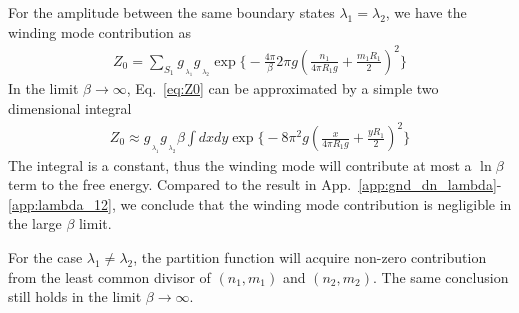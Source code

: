 For the amplitude between the same boundary states $\lambda_1=\lambda_2$, we have the winding mode contribution as
\begin{equation}
\begin{aligned}
\label{eq:Z0}
Z_0 = \sum_{S_1 } g_{\,\!_{\lambda_1} }g_{\,\!_{\lambda_2} } \exp\Big\{- \frac{4\pi}{\beta} 2 \pi g ( \frac{n_1}{ 4 \pi R_1 g} + \frac{m_1 R_1 }{ 2} )^2 \Big\}
\end{aligned}
\end{equation}
In the limit $\beta\rightarrow\infty$, Eq.~\eqref{eq:Z0} can be approximated by a simple two dimensional integral
\begin{equation}\begin{aligned}
Z_0\approx g_{\,\!_{\lambda_1} }g_{\,\!_{\lambda_2} }\beta\int dxdy\exp\Big\{-8 \pi^2 g ( \frac{x}{ 4 \pi R_1 g} + \frac{y R_1 }{ 2} )^2 \Big\}
\end{aligned}\end{equation}
The integral is a constant, thus the winding mode will contribute at most a $\ln\beta$ term to the free energy. Compared to the result in App.~\ref{app:gnd_dn_lambda}-\ref{app:lambda_12}, we conclude that the winding mode contribution is negligible in the large $\beta$ limit. 

For the case $\lambda_1\neq\lambda_2$, the partition function will acquire non-zero contribution from the least common divisor of $(n_1,m_1)$ and $(n_2,m_2)$. The same conclusion still holds in the limit $\beta\rightarrow\infty$. 


